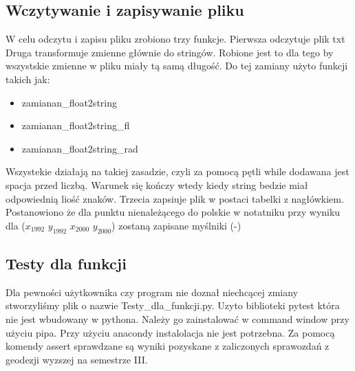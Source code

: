 \newpage
\subsection{Wczytywanie i zapisywanie pliku}
W celu odczytu i zapisu pliku zrobiono trzy funkcje. Pierwsza odczytuje plik txt Druga transformuje zmienne głównie do stringów. Robione jest to dla tego by wszystskie zmienne w pliku miały tą samą długość. Do tej zamiany użyto funkcji takich jak:
\begin{itemize}
\item zamianan\_{}float2string
\item zamianan\_{}float2string\_{}fl
\item zamianan\_{}float2string\_{}rad
\end{itemize}
Wszystekie działają na takiej zasadzie, czyli za pomocą pętli while dodawana jest spacja przed liczbą. Warunek się kończy wtedy kiedy string bedzie miał odpowiednią liość znaków. Trzecia zapsiuje plik w postaci tabelki z nagłówkiem. Postanowiono że dla punktu nienależącego do polskie w notatniku przy wyniku dla ($x_{1992}$ $y_{1992}$ $x_{2000}$ $y_{2000}$) zostaną zapisane myślniki (-)

\subsection{Testy dla funkcji}
Dla pewności użytkownika czy program nie doznał niechcącej zmiany stworzyliśmy plik o nazwie Testy\_{}dla\_{}funkcji.py. Uzyto biblioteki pytest która nie jest wbudowany w pythona. Należy go zainstalować w command window przy użyciu pipa. Przy użyciu anacondy instalolacja nie jest potrzebna. Za pomocą komendy assert sprawdzane są wyniki pozyskane z zaliczonych sprawozdań z geodezji wyzszej na semestrze III.   

